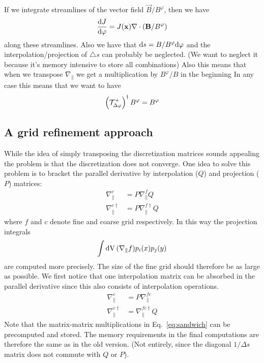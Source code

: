 If we integrate streamlines of the vector field $\vec B/B^\varphi$, then we have
\begin{align}
    \frac{\mathrm{d} J}{\mathrm{d} \varphi} = J({\mathbf{x}} ) \nabla\cdot\left( {\mathbf{B}}/B^\varphi\right)
    \label{}
\end{align}
along these streamlines.
Also we have that $\mathrm{d} s = B/B^\varphi \mathrm{d} \varphi $ and the interpolation/projection of $\triangle s$ can probably be neglected. (We want to neglect it because it's memory intensive to store all combinations)
Also this means that when we transpose $\nabla_\parallel$ we get a
multiplication by $B^\varphi/B$ in the beginning
In any case this means that we want to have
\begin{align}
\left(\mathcal T^+_{\Delta\varphi}\right)^\dagger B^\varphi  =  B^\varphi
\end{align}


\subsection{A grid refinement approach}
While the idea of simply transposing the discretization matrices sounds appealing the problem
is that the discretization does not converge.
One idea to solve this problem \cite{Stegmeir2017} is
to bracket the parallel derivative by interpolation ($Q$) and
projection ($P$) matrices:
\begin{align}
    \nabla^c_\parallel &= P\nabla_\parallel^f Q \\
    \nabla^{c\dagger}_\parallel &= P \nabla^{f\dagger}_\parallel Q
    \label{eq:sandwich}
\end{align}
where $f$ and $c$ denote fine and coarse grid respectively.
In this way the projection integrals
\begin{align*}
    \int\mathrm{dV}\, (\nabla_\parallel f) p_i(x)p_j(y)
    \label{}
\end{align*}
are computed more precisely.
The size of the fine grid should therefore be as large as
possible.
We first notice that one interpolation matrix can be absorbed
in the parallel derivative since this also consists of
interpolation operations.
\begin{align}
    \nabla^c_\parallel &= P\nabla_\parallel^{fc} \\
    \nabla^{c\dagger}_\parallel &= \nabla^{fc\dagger}_\parallel Q
    \label{eq:sandwich}
\end{align}
Note that the matrix-matrix multiplications in Eq.~\eqref{eq:sandwich} can
be precomputed and stored. The memory requirements
in the final computations are
therefore the same  as in the old version. (Not entirely, since
the diagonal $1/\Delta s$ matrix does not commute with $Q$ or $P$).

